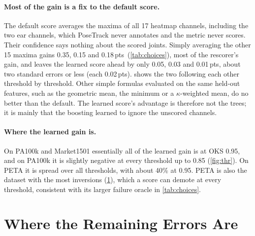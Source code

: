 \documentclass[10pt,twocolumn,letterpaper]{article}
\newcommand{\pts}{\,pts}
\begin{document}
\paragraph{Most of the gain is a fix to the default score.} The default score averages the maxima of all 17 heatmap channels, including the two ear channels, which PoseTrack never annotates and the metric never scores. Their confidence says nothing about the scored joints. Simply averaging the other 15 maxima gains 0.35, 0.15 and 0.18\pts\ (\cref{tab:choices}), most of the rescorer's gain, and leaves the learned score ahead by only 0.05, 0.03 and 0.01\pts, about two standard errors or less (each 0.02\pts).  shows the two following each other threshold by threshold. Other simple formulas evaluated on the same held-out features, such as the geometric mean, the minimum or a $\kappa$-weighted mean, do no better than the default. The learned score's advantage is therefore not the trees; it is mainly that the boosting learned to ignore the unscored channels.

\paragraph{Where the learned gain is.} On PA100k and Market1501 essentially all of the learned gain is at OKS 0.95, and on PA100k it is slightly negative at every threshold up to 0.85 (\cref{fig:thr}). On PETA it is spread over all thresholds, with about 40\% at 0.95. PETA is also the dataset with the most inversions (\cref{sec:errors}), which a score can demote at every threshold, consistent with its larger failure oracle in \cref{tab:choices}.

\section{Where the Remaining Errors Are}
\label{sec:errors}
\end{document}
